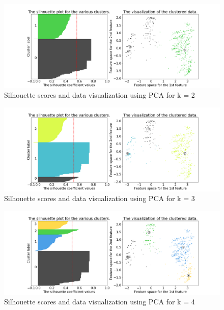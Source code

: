 \documentclass[times, utf8, zavrsni, numeric]{fer}
\begin{document}
\begin{figure}[H]
    \centering
    \includegraphics[width=\linewidth]{figures/silhouette_2}
    \caption{Silhouette scores and data visualization using PCA for k = 2}
    \label{fig:silhouette1}
  \end{figure}

  \begin{figure}[H]
    \centering
    \includegraphics[width=\linewidth]{figures/silhouette_3}
    \caption{Silhouette scores and data visualization using PCA for k = 3}
    \label{fig:silhouette2}
  \end{figure}

  \begin{figure}[H]
    \centering
    \includegraphics[width=\linewidth]{figures/silhouette_4}
    \caption{Silhouette scores and data visualization using PCA for k = 4}
    \label{fig:silhouette3}
  \end{figure}
\end{document}
